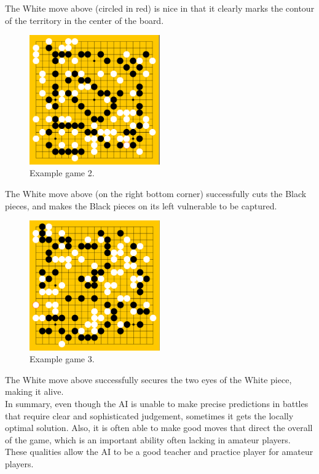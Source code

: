\documentclass[11pt]{article}
\begin{document}
The White move above (circled in red) is nice in that it clearly marks the contour of the territory in the center of the board.
\begin{figure}[H]
    \centering
    \includegraphics[width=0.5\textwidth]{game_2.png}
    \caption{Example game 2.}
\end{figure}
The White move above (on the right bottom corner) successfully cuts the Black pieces, and makes the Black pieces on its left vulnerable to be captured. 
\begin{figure}[H]
    \centering
    \includegraphics[width=0.5\textwidth]{game_3.png}
    \caption{Example game 3.}
\end{figure}
The White move above successfully secures the two eyes of the White piece, making it alive. \\
In summary, even though the AI is unable to make precise predictions in battles that require clear and sophisticated judgement, sometimes it gets the locally optimal solution. Also, it is often able to make good moves that direct the overall of the game, which is an important ability often lacking in amateur players. These qualities allow the AI to be a good teacher and practice player for amateur players. 
\newpage
\end{document}
